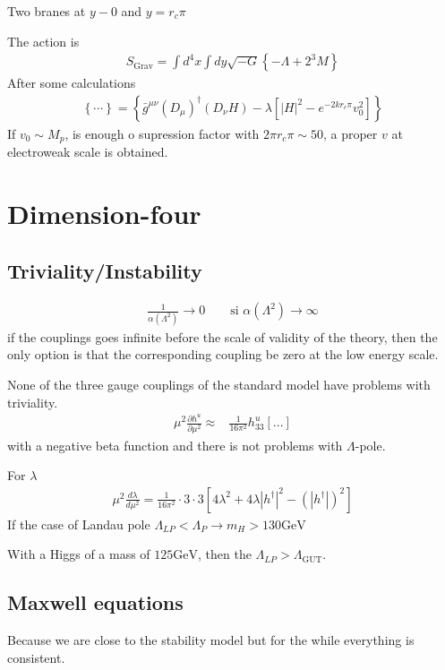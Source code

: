 \documentclass[12pt,letterpaper]{article}
\begin{document}
Two branes at $y-0$ and $y=r_c\pi$

The action is
\begin{align*}
  S_{\text{Grav}}=\int d^4x\int dy\sqrt{-G}\left\{ 
-\Lambda+2^3M \right\}
\end{align*}
After some calculations
\begin{align*}
  \left\{ \cdots \right\}
=\left\{ \bar{g}^{\mu\nu}(D_{\mu})^{\dagger}(D_{\nu}H)
-\lambda \left[ \left| H \right|^2 -e^{-2k r_c\pi}v_0^2\right] \right\}
\end{align*}
If $v_0\sim M_p$, is enough o supression factor with $2\pi r_c \pi\sim
50$, a proper $v$ at electroweak scale is obtained.

\section{Dimension-four}

\subsection{Triviality/Instability}
\begin{align*}
  \frac{1}{\alpha(\Lambda^2)}\to 0\qquad\text{si $\alpha(\Lambda^2)\to\infty$}
\end{align*}
if the couplings goes infinite before the scale of validity of the
theory, then the only option is that the corresponding coupling be
zero at the low energy scale.

None of the three gauge  couplings of the standard model have problems
with triviality.
\begin{align*}
  \mu^2 \frac{\partial h^u}{\partial \mu^2}\approx &
\frac{1}{16\pi^2}h^u_{33}\left[ ... \right]
\end{align*}
with a negative beta function and there is not problems with $\Lambda$-pole.

For $\lambda$
\begin{align*}
  \mu^2 \frac{d\lambda}{d\mu^2}=
\frac{1}{16\pi^{2}}\cdot 3\cdot 3
\left[ 4\lambda^2+4\lambda|h^{\dagger}|^2-(|h^{\dagger}|)^2 \right]
\end{align*}
If the case of Landau pole $\Lambda_{LP}<\Lambda_P\rightarrow m_H>130\text{GeV}$

With a Higgs of a mass of $125\text{GeV}$, then the $\Lambda_{LP}>\Lambda_{\text{GUT}}$.

\subsection{Maxwell equations}
Because we are close to the stability model but for the while
everything is consistent.
\end{document}
